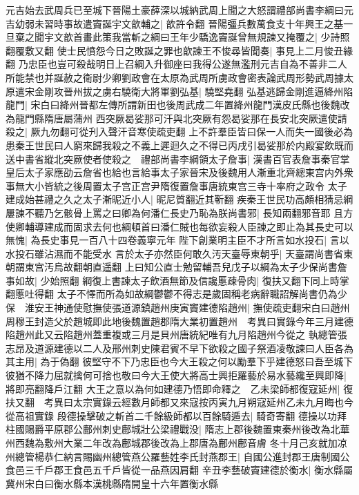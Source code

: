 元吉始去武周兵已至城下晉陽土豪薛深以城納武周上聞之大怒謂禮部尚書李綱曰元吉幼弱未習時事故遣竇誕宇文歆輔之|{
	歆許令翻}
晉陽彊兵數萬食支十年興王之基一旦棄之聞宇文歆首畫此策我當斬之綱曰王年少驕逸竇誕曾無規諫又掩覆之|{
	少詩照翻覆敷又翻}
使士民憤怨今日之敗誕之罪也歆諫王不悛尋皆聞奏|{
	事見上二月悛丑緣翻}
乃忠臣也豈可殺哉明日上召綱入升御座曰我得公遂無濫刑元吉自為不善非二人所能禁也并誕赦之衛尉少卿劉政會在太原為武周所虜政會密表論武周形勢武周據太原遣宋金剛攻晉州拔之虜右驍衛大將軍劉弘基|{
	驍堅堯翻}
弘基逃歸金剛進逼絳州陷龍門|{
	宋白曰絳州晉都左傳所謂新田也後周武成二年置絳州龍門漢皮氏縣也後魏改為龍門縣隋唐屬蒲州}
西突厥曷娑那可汗與北突厥有怨曷娑那在長安北突厥遣使請殺之|{
	厥九勿翻可從刋入聲汗音寒使疏吏翻}
上不許羣臣皆曰保一人而失一國後必為患秦王世民曰人窮來歸我殺之不義上遲迴久之不得已丙戌引曷娑那於内殿宴飲既而送中書省縱北突厥使者使殺之　禮部尚書李綱領太子詹事|{
	漢書百官表詹事秦官掌皇后太子家應劭云詹省也給也言給事太子家晉宋及後魏用人漸重北齊總東宫内外衆事無大小皆統之後周置太子宫正宫尹隋復置詹事唐統東宫三寺十率府之政令}
太子建成始甚禮之久之太子漸昵近小人|{
	昵尼質翻近其靳翻}
疾秦王世民功高頗相猜忌綱屢諫不聽乃乞骸骨上罵之曰卿為何潘仁長史乃恥為朕尚書邪|{
	長知兩翻邪音耶}
且方使卿輔導建成而固求去何也綱頓首曰潘仁賊也每欲妄殺人臣諫之即止為其長史可以無愧|{
	為長史事見一百八十四卷義寧元年}
陛下創業明主臣不才所言如水投石|{
	言以水投石雖沾濕而不能受水}
言於太子亦然臣何敢久汚天臺辱東朝乎|{
	天臺謂尚書省東朝謂東宫汚烏故翻朝直遥翻}
上曰知公直士勉留輔吾兒戊子以綱為太子少保尚書詹事如故|{
	少始照翻}
綱復上書諫太子飲酒無節及信讒慝疎骨肉|{
	復扶又翻下同上時掌翻慝吐得翻}
太子不懌而所為如故綱鬱鬱不得志是歲固稱老病辭職詔解尚書仍為少保　淮安王神通使慰撫使張道源鎮趙州庚寅竇建德陷趙州|{
	撫使疏吏翻宋白曰趙州周穆王封造父於趙城即此地後魏置趙郡隋大業初置趙州　考異曰實錄今年三月建德陷趙州此又云陷趙州蓋重複或三月是貝州唐統紀唯有九月陷趙州今從之}
執總管張志昂及道源建德以二人及邢州刺史陳君賓不早下欲殺之國子祭酒凌敬諫曰人臣各為其主用|{
	為于偽翻}
彼堅守不下乃忠臣也今大王殺之何以勵羣下乎建德怒曰吾至城下彼猶不降力屈就擒何可捨也敬曰今大王使大將高士興拒羅藝於易水藝纔至興即降|{
	將即亮翻降戶江翻}
大王之意以為何如建德乃悟即命釋之　乙未梁師都復寇延州|{
	復扶又翻　考異曰太宗實錄云經數月師都又來寇按丙寅九月朔寇延州乙未九月晦也今從高祖實錄}
段德操擊破之斬首二千餘級師都以百餘騎遁去|{
	騎奇寄翻}
德操以功拜柱國賜爵平原郡公鄜州刺史鄜城壯公梁禮戰没|{
	隋志上郡後魏置東秦州後改為北華州西魏為敷州大業二年改為鄜城郡後改為上郡唐為鄜州鄜音膚}
冬十月己亥就加凉州總管楊恭仁納言賜幽州總管燕公羅藝姓李氏封燕郡王|{
	自國公進封郡王唐制國公食邑三千戶郡王食邑五千戶皆從一品燕因肩翻}
辛丑李藝破竇建德於衡水|{
	衡水縣屬冀州宋白曰衡水縣本漢桃縣隋開皇十六年置衡水縣}
